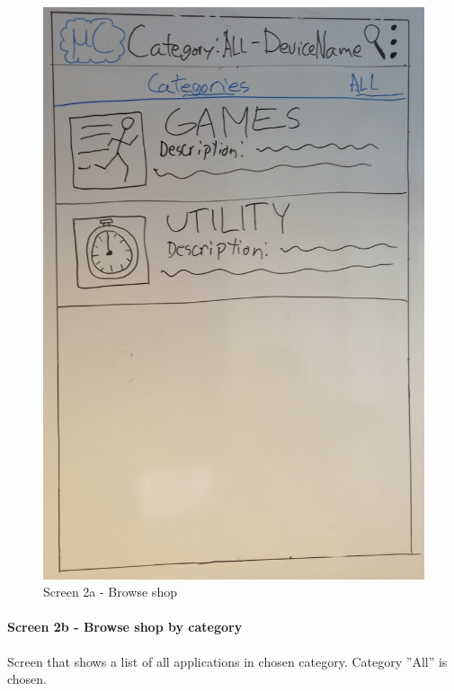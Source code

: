 \begin{figure}[H]
\centering
\includegraphics[scale=0.2]{images/Design_guide/Screen2a.png}
\caption{Screen 2a - Browse shop}
\end{figure}


\paragraph{Screen 2b - Browse shop by category}
Screen that shows a list of all applications in chosen category. Category ''All'' is chosen.

